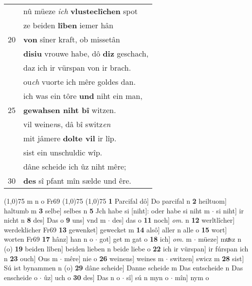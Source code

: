 \documentclass[8pt,a4paper,notitlepage]{article}
\begin{document}
\begin{table}[ht]
\begin{minipage}[t]{0.5\linewidth}
\begin{tabular}{rl}
 & nû müeze \textit{ich} \textbf{vlusteclîchen} spot\\ 
 & ze beiden \textbf{lîben} iemer hân\\ 
20 & \textbf{von} sîner kraft, ob missetân\\ 
 & \textbf{disiu} vrouwe habe, dô \textbf{diz} geschach,\\ 
 & daz ich ir vürspan von ir brach.\\ 
 & ou\textit{ch} vuorte ich mêre goldes dan.\\ 
 & ich was ein tôre \textbf{und} niht ein man,\\ 
25 & \textbf{gewahsen niht bî} witzen.\\ 
 & vil weine\textit{n}s, dâ bî switz\textit{en}\\ 
 & mit jâmere \textbf{dolte vil} ir lîp.\\ 
 & sist ein unschuldic wîp.\\ 
 & dâne scheide ich ûz niht mêre;\\ 
30 & \textbf{des} sî pfant mîn sælde und êre.\\ 
\end{tabular}
\scriptsize
\line(1,0){75} \newline
m n o Fr69 \newline
\line(1,0){75} \newline
\newline
\line(1,0){75} \newline
\textbf{1} Parcifal dô] Do parcifal n \textbf{2} heiltuom] haltumb m \textbf{3} selbe] selbes n \textbf{5} Jch habe si [niht]: oder habe si niht m  $\cdot$ si niht] ir nicht n \textbf{8} des] Das o \textbf{9} uns] vnd m  $\cdot$ des] das o \textbf{11} noch] \textit{om.} n \textbf{12} werltlîcher] werdeklicher Fr69 \textbf{13} gewenket] gewecket m \textbf{14} alsô] aller n alle o \textbf{15} wort] worten Fr69 \textbf{17} hânz] han n o  $\cdot$ got] get m gat o \textbf{18} ich] \textit{om.} m  $\cdot$ müeze] muͯsz n (o) \textbf{19} beiden lîben] beiden lieben n beide liebe o \textbf{22} ich ir vürspan] ir fúrspan ich n \textbf{23} ouch] Ous m  $\cdot$ mêre] nie o \textbf{26} weinens] weines m  $\cdot$ switzen] swicz m \textbf{28} sist] Sú ist bynammen n (o) \textbf{29} dâne scheide] Danne scheide m Das entscheide n Das enscheide o  $\cdot$ ûz] uch o \textbf{30} des] Das n o  $\cdot$ sî] sú n myn o  $\cdot$ mîn] nym o \newline
\end{minipage}
\end{table}
\newpage
\end{document}
